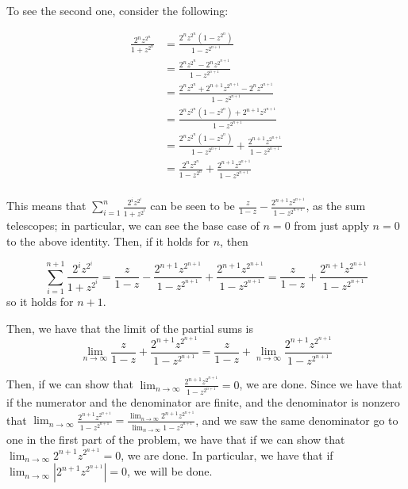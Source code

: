 \documentclass[12pt,letterpaper]{article}
\theoremstyle{definition}
\begin{document}
To see the second one, consider the following:

\begin{align*}
  \frac{2^{n}z^{2^{n}}}{1 + z^{2^{n}}} &= \frac{2^{n}z^{2^{n}}(1-z^{2^{n}})}{1-z^{2^{n+1}}} \\
                                       &= \frac{2^{n}z^{2^{n}}-2^{n}z^{2^{n+1}}}{1-z^{2^{n+1}}} \\
                                       &= \frac{2^{n}z^{2^{n}} + 2^{n+1}z^{2^{n+1}}-2^{n}z^{2^{n+1}}}{1-z^{2^{n+1}}} \\
                                       &= \frac{2^{n}z^{2^{n}}(1-z^{2^{n}}) + 2^{n+1}z^{2^{n+1}}}{1-z^{2^{n+1}}} \\
                                       &= \frac{2^{n}z^{2^{n}}(1-z^{2^{n}})}{1-z^{2^{n+1}}} + \frac{2^{n+1}z^{2^{n+1}}}{1-z^{2^{n+1}}} \\
                                       &= \frac{2^{n}z^{2^{n}}}{1-z^{2^{n}}} + \frac{2^{n+1}z^{2^{n+1}}}{1-z^{2^{n+1}}} \\
\end{align*}

This means that $\sum_{i=1}^{n}\frac{2^{i}z^{2^{i}}}{1+z^{2^{i}}}$ can be seen to be $\frac{z}{1-z} - \frac{2^{n+1}z^{2^{n+1}}}{1-z^{2^{n+1}}}$, as the sum telescopes; in particular, we can see the base case of $n = 0$ from just apply $n=0$ to the above identity. Then, if it holds for $n$, then

\[
  \sum_{i=1}^{n+1}\frac{2^{i}z^{2^{i}}}{1+z^{2^{i}}} = \frac{z}{1-z} - \frac{2^{n+1}z^{2^{n+1}}}{1-z^{2^{n+1}}} + \frac{2^{n+1}z^{2^{n+1}}}{1-z^{2^{n+1}}} = \frac{z}{1-z} + \frac{2^{n+1}z^{2^{n+1}}}{1-z^{2^{n+1}}}
\]
so it holds for $n+1$.

Then, we have that the limit of the partial sums is
\[
  \lim_{n \rightarrow\infty}\frac{z}{1-z} + \frac{2^{n+1}z^{2^{n+1}}}{1-z^{2^{n+1}}} = \frac{z}{1-z} + \lim_{n \rightarrow \infty} \frac{2^{n+1}z^{2^{n+1}}}{1-z^{2^{n+1}}}
\]

Then, if we can show that $\lim_{n \rightarrow \infty} \frac{2^{n+1}z^{2^{n+1}}}{1-z^{2^{n+1}}} = 0$, we are done. Since we have that if the numerator and the denominator are finite, and the denominator is nonzero that $\lim_{n \rightarrow \infty} \frac{2^{n+1}z^{2^{n+1}}}{1-z^{2^{n+1}}} = \frac{\lim_{n \rightarrow \infty}2^{n+1}z^{2^{n+1}}}{\lim_{n \rightarrow \infty}1-z^{2^{n+1}}}$, and we saw the same denominator go to one in the first part of the problem, we have that if we can show that $\lim_{n \rightarrow \infty}2^{n+1}z^{2^{n+1}} = 0$, we are done. In particular, we have that if $\lim_{n \rightarrow\infty}|2^{n+1}z^{2^{n+1}}| = 0$, we will be done.
\end{document}
